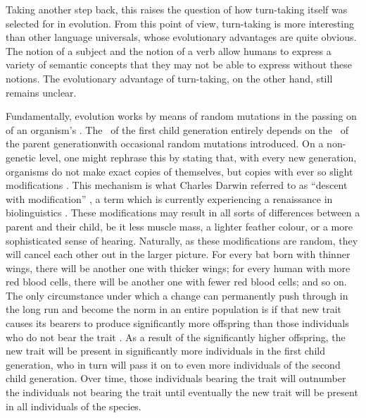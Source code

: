 Taking another step back, this raises the question of how turn-taking itself was selected for in evolution.
From this point of view, turn-taking is more interesting than other language universals, whose evolutionary advantages are quite obvious.
The notion of a subject and the notion of a verb \citep[both considered language universals,][]{robins_noun_1952,hopper_iconicity_1985} allow humans to express a variety of semantic concepts that they may not be able to express without these notions.
The evolutionary advantage of turn-taking, on the other hand, still remains unclear.

Fundamentally, evolution works by means of random mutations in the passing on of an organism's \dna.
The \dna\ of the first child generation entirely depends on the \dna\ of the parent generation\dash with occasional random mutations introduced.
On a non-genetic level, one might rephrase this by stating that, with every new generation, organisms do not make exact copies of themselves, but copies with ever so slight modifications \citep[]{dediu_introduction_2015}.
This mechanism is what Charles Darwin referred to as ``descent with modification'' \citep[]{darwin_origin_1958}, a term which is currently experiencing a renaissance in biolinguistics \citep[e.g.][]{boeckx_conjecture_2017}.
These modifications may result in all sorts of differences between a parent and their child, be it less muscle mass, a lighter feather colour, or a more sophisticated sense of hearing.
Naturally, as these modifications are random, they will cancel each other out in the larger picture.
For every bat born with thinner wings, there will be another one with thicker wings; for every human with more red blood cells, there will be another one with fewer red blood cells; and so on.
The only circumstance under which a change can permanently push through in the long run and become the norm in an entire population is if that new trait causes its bearers to produce significantly more offspring than those individuals who do not bear the trait \citep[]{dediu_introduction_2015}.
As a result of the significantly higher offspring, the new trait will be present in significantly more individuals in the first child generation, who in turn will pass it on to even more individuals of the second child generation.
Over time, those individuals bearing the trait will outnumber the individuals not bearing the trait until eventually the new trait will be present in all individuals of the species.%
